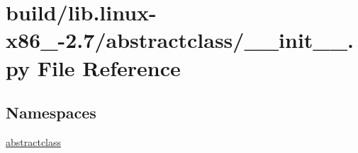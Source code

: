 \hypertarget{build_2lib_8linux-x86__64-2_87_2abstractclass_2____init_____8py}{}\section{build/lib.linux-\/x86\+\_-\/2.7/abstractclass/\+\_\+\+\_\+init\+\_\+\+\_\+.py File Reference}
\label{build_2lib_8linux-x86__64-2_87_2abstractclass_2____init_____8py}
\subsection*{Namespaces}
\begin{DoxyCompactItemize}
\item 
 \hyperlink{namespaceabstractclass}{abstractclass}
\end{DoxyCompactItemize}
